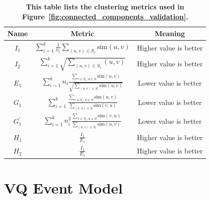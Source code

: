 \begin{table}
  \centering
  \begin{tabular}{ c  c  c }
    \toprule
    Name & Metric & Meaning \\
    \midrule
    $I_1$ & $\sum_{i=1}^k \frac{1}{n_i} \sum_{(u,v) \in S_i} \text{sim}(u,v)$ & Higher value is better\\
    \midrule
    $I_2$ & $\sum_{i=1}^k \sqrt{ \sum_{(u,v) \in S_i} (u,v)}$ & Higher value is better \\
    \midrule
    $E_1$ & $\sum_{i=1}^{k} n_i \frac{\sum_{v \in S_i, u \in S} \text{sim}(u,v)}{\sqrt{\sum_{(u,v) \in S_i} \text{sim}(u,v)}}$ & Lower value is better \\
    \midrule
    $G_1$ & $\sum_{i=1}^k \frac{\sum_{v \in S_i, u \in S}\text{sim}(u,v)}{\sum_{(v,u) \in S}\text{sim}(v,u)}$ & Lower value is better \\
    \midrule
    $G_1^{'}$ & $\sum_{i=1}^k n_i^2 \frac{\sum_{v \in S_i, u \in S}\text{sim}(v,u)}{\sum_{(u,v) \in S_i}\text{sim}(u,v)}$ & Lower value is better \\
    \midrule
    $H_1$ & $\frac{I_1}{E_1}$ & Higher value is better \\
    \midrule
    $H_2$ & $\frac{I_2}{E_1}$ & Higher value is better \\
    \bottomrule
  \end{tabular}
  \caption{\textbf{This table lists the clustering metrics used in Figure~\ref{fig:connected_components_validation}.}}
  \label{table:clustering_metrics}
\end{table}

\section{VQ Event Model}

